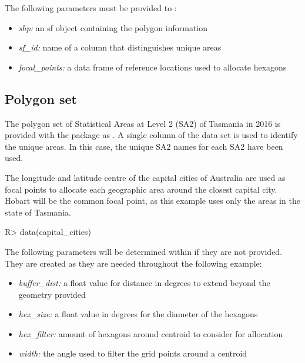 \documentclass[
]{jss}
\providecommand{\tightlist}{%
  \setlength{\itemsep}{0pt}\setlength{\parskip}{0pt}}
\begin{document}
The following parameters must be provided to :

\begin{itemize}
\tightlist
\item
  \emph{shp:} an sf object containing the polygon information
\item
  \emph{sf\_id:} name of a column that distinguishes unique areas
\item
  \emph{focal\_points:} a data frame of reference locations used to
  allocate hexagons
\end{itemize}

\hypertarget{polygon-set}{%
\subsection{Polygon set}\label{polygon-set}}

The polygon set of Statistical Areas at Level 2 (SA2) \citep{abs2016} of
Tasmania in 2016 is provided with the  package as
. A single column of the data set is used to identify the
unique areas. In this case, the unique SA2 names for each SA2 have been
used.

The longitude and latitude centre of the capital cities of Australia are
used as focal points to allocate each geographic area around the closest
capital city. Hobart will be the common focal point, as this example
uses only the areas in the state of Tasmania.

\begin{CodeChunk}

\begin{CodeInput}
R> data(capital_cities)
\end{CodeInput}
\end{CodeChunk}

The following parameters will be determined within 
if they are not provided. They are created as they are needed throughout
the following example:

\begin{itemize}
\tightlist
\item
  \emph{buffer\_dist:} a float value for distance in degrees to extend
  beyond the geometry provided
\item
  \emph{hex\_size:} a float value in degrees for the diameter of the
  hexagons
\item
  \emph{hex\_filter:} amount of hexagons around centroid to consider for
  allocation
\item
  \emph{width:} the angle used to filter the grid points around a
  centroid
\end{itemize}
\end{document}
